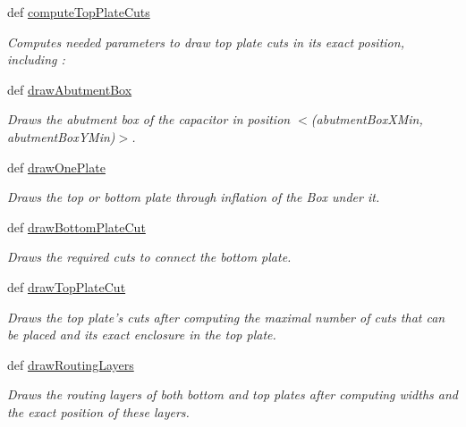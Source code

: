 \begin{DoxyCompactItemize}
def \hyperlink{classpython_1_1CapacitorUnit_1_1CapacitorUnit_aceb634d48d79f2079c690297c820da0b}{compute\-Top\-Plate\-Cuts}
\begin{DoxyCompactList}\small\item\em Computes needed parameters to draw top plate cuts in its exact position, including \-: \end{DoxyCompactList}\item 
def \hyperlink{classpython_1_1CapacitorUnit_1_1CapacitorUnit_ac5cd73be473bc321a29a75311f808835}{draw\-Abutment\-Box}
\begin{DoxyCompactList}\small\item\em Draws the abutment box of the capacitor in position {\ttfamily $<$}(abutment\-Box\-X\-Min, abutment\-Box\-Y\-Min)$>$. \end{DoxyCompactList}\item 
def \hyperlink{classpython_1_1CapacitorUnit_1_1CapacitorUnit_a7b4116e4696b869f462d86b1ddf00246}{draw\-One\-Plate}
\begin{DoxyCompactList}\small\item\em Draws the top or bottom plate through inflation of the Box under it. \end{DoxyCompactList}\item 
def \hyperlink{classpython_1_1CapacitorUnit_1_1CapacitorUnit_a1a998a3072560eaee998c9e5531a5f5b}{draw\-Bottom\-Plate\-Cut}
\begin{DoxyCompactList}\small\item\em Draws the required cuts to connect the bottom plate. \end{DoxyCompactList}\item 
def \hyperlink{classpython_1_1CapacitorUnit_1_1CapacitorUnit_a8d4cd239412ffde81f0cda52123b9c1d}{draw\-Top\-Plate\-Cut}
\begin{DoxyCompactList}\small\item\em Draws the top plate's cuts after computing the maximal number of cuts that can be placed and its exact enclosure in the top plate. \end{DoxyCompactList}\item 
def \hyperlink{classpython_1_1CapacitorUnit_1_1CapacitorUnit_a444cc6c0ee175ba22b5092d0706bc0d6}{draw\-Routing\-Layers}
\begin{DoxyCompactList}\small\item\em Draws the routing layers of both bottom and top plates after computing widths and the exact position of these layers. \end{DoxyCompactList}\item 

\end{DoxyCompactItemize}
